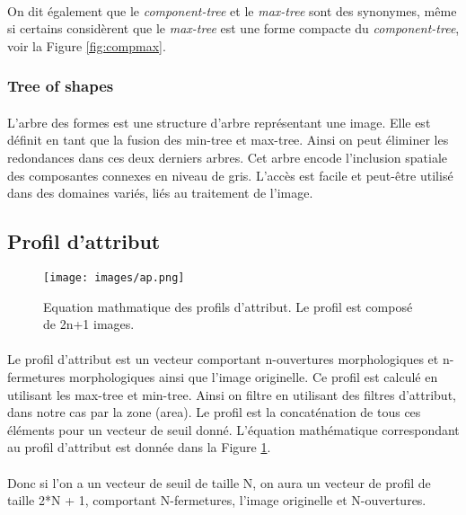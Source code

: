 \documentclass[paper=a4, 11pt]{article}
\begin{document}
\paragraph{} On dit également que le \textit{component-tree} et le \textit{max-tree} sont des synonymes, même si certains considèrent que le \textit{max-tree} est une forme compacte du \textit{component-tree}, voir la Figure \ref{fig:compmax}.

\subsubsection{Tree of shapes}
\paragraph{} L'arbre des formes est une structure d'arbre représentant une image. Elle est définit en tant que la fusion des min-tree et max-tree. Ainsi on peut éliminer les redondances dans ces deux derniers arbres. Cet arbre encode l'inclusion spatiale des composantes connexes en niveau de gris. L'accès est facile et peut-être utilisé dans des domaines variés, liés au traitement de l'image.

\subsection{Profil d'attribut}

\begin{figure}[h]
\centering
\texttt{[image: images/ap.png]}
\caption{Equation mathmatique des profils d'attribut. Le profil est composé de 2n+1 images.}
\label{fig:ap}
\end{figure}

\paragraph{} Le profil d'attribut est un vecteur comportant n-ouvertures morphologiques et n-fermetures morphologiques ainsi que l'image originelle. Ce profil est calculé en utilisant les max-tree et min-tree. Ainsi on filtre en utilisant des filtres d'attribut, dans notre cas par la zone (area). Le profil est la concaténation de tous ces éléments pour un vecteur de seuil donné. L'équation mathématique correspondant au profil d'attribut est donnée dans la Figure \ref{fig:ap}.

\paragraph{} Donc si l'on a un vecteur de seuil de taille N, on aura un vecteur de profil de taille 2*N + 1, comportant N-fermetures, l'image originelle et N-ouvertures.
\end{document}
